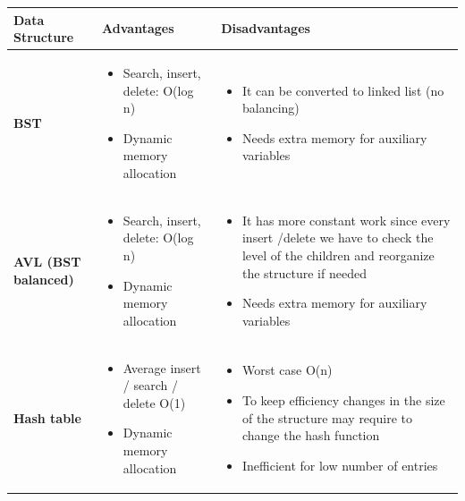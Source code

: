 \documentclass{article}
\begin{document}
\begin{table}[H]
	\small
	\centering
    \begin{tabulary}{1.0\textwidth}{L p{0.4\textwidth} p{0.4\textwidth}} 
        \textbf{Data  Structure} & \textbf{\hspace{5mm} Advantages} & \textbf{\hspace{1cm}Disadvantages} \\
        \hline

        \textbf{BST} & \begin{itemize} \item{Search, insert, delete: O(log n)} \item{Dynamic memory allocation}  \end{itemize} & \begin{itemize} \item{It can be converted to linked list (no balancing)} \item{Needs extra memory for auxiliary variables} \end{itemize}\\
        
        
        \textbf{AVL (BST balanced)} & \begin{itemize} \item{Search, insert, delete: O(log n)} \item{Dynamic memory allocation}  \end{itemize} & \begin{itemize} \item{It has more constant work since every insert /\newline delete  we have to check the level of the children and reorganize the structure if needed} \item{Needs extra memory  for auxiliary variables} \end{itemize}\\
        
        \textbf{Hash table} & \begin{itemize} \item{Average insert / search / delete O(1)} \item{Dynamic memory allocation}  \end{itemize} & \begin{itemize} \item{Worst case O(n)} \item{To keep efficiency changes in the size of the structure may \newline require  to change the hash function} \item{Inefficient for low number of entries} \end{itemize}\\
        

\end{tabulary}
\end{table}
\end{document}
